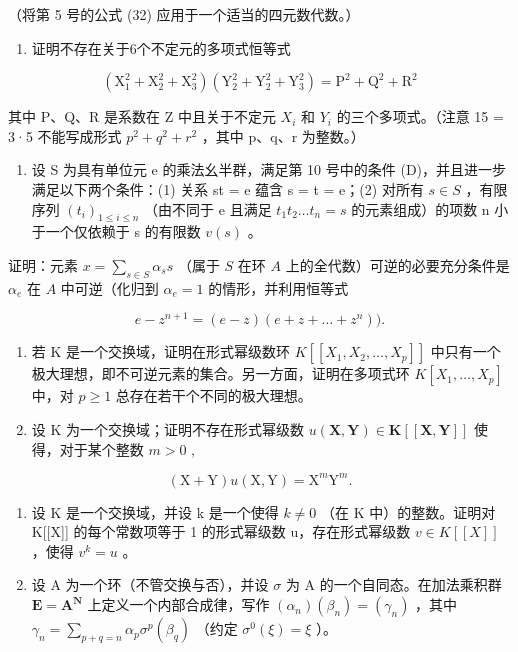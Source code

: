（将第 5 号的公式 (32) 应用于一个适当的四元数代数。）

\begin{enumerate}
\def\labelenumi{\arabic{enumi}.}
\setcounter{enumi}{19}
\tightlist
\item
  证明不存在关于6个不定元的多项式恒等式
\end{enumerate}

\[
(\mathrm{X} _ {1} ^ {2} + \mathrm{X} _ {2} ^ {2} + \mathrm{X} _ {3} ^ {2}) (\mathrm{Y} _ {2} ^ {2} + \mathrm{Y} _ {2} ^ {2} + \mathrm{Y} _ {3} ^ {2}) = \mathrm{P} ^ {2} + \mathrm{Q} ^ {2} + \mathrm{R} ^ {2}
\]

其中 P、Q、R 是系数在 Z 中且关于不定元 \(X_{i}\) 和 \(Y_{i}\) 的三个多项式。（注意 15 = 3·5 不能写成形式 \(p^{2} + q^{2} + r^{2}\) ，其中 p、q、r 为整数。）

\begin{enumerate}
\def\labelenumi{\arabic{enumi}.}
\setcounter{enumi}{20}
\tightlist
\item
  设 S 为具有单位元 e 的乘法幺半群，满足第 10 号中的条件 (D)，并且进一步满足以下两个条件：(1) 关系 st = e 蕴含 s = t = e；(2) 对所有 \(s \in S\) ，有限序列 \((t_{i})_{1 \leq i \leq n}\) （由不同于 e 且满足 \(t_{1}t_{2} \ldots t_{n} = s\) 的元素组成）的项数 n 小于一个仅依赖于 s 的有限数 \(v(s)\) 。
\end{enumerate}

证明：元素 \(x = \sum_{s \in S} \alpha_s s\) （属于 \(S\) 在环 \(A\) 上的全代数）可逆的必要充分条件是 \(\alpha_e\) 在 \(A\) 中可逆（化归到 \(\alpha_e = 1\) 的情形，并利用恒等式

\[
e - z ^ {n + 1} = (e - z) (e + z + \dots + z ^ {n})).
\]

\begin{enumerate}
\def\labelenumi{\arabic{enumi}.}
\setcounter{enumi}{21}
\item
  若 K 是一个交换域，证明在形式幂级数环 \(K[[X_{1}, X_{2}, \ldots, X_{p}]]\) 中只有一个极大理想，即不可逆元素的集合。另一方面，证明在多项式环 \(K[X_{1}, \ldots, X_{p}]\) 中，对 \(p \geqslant 1\) 总存在若干个不同的极大理想。
\item
  设 K 为一个交换域；证明不存在形式幂级数 \(u(\mathbf{X}, \mathbf{Y}) \in \mathbf{K}[[\mathbf{X}, \mathbf{Y}]]\) 使得，对于某个整数 \(m > 0\) ,
\end{enumerate}

\[
(\mathrm{X} + \mathrm{Y}) u (\mathrm{X}, \mathrm{Y}) = \mathrm{X} ^ {m} \mathrm{Y} ^ {m}.
\]

\begin{enumerate}
\def\labelenumi{\arabic{enumi}.}
\setcounter{enumi}{23}
\item
  设 K 是一个交换域，并设 k 是一个使得 \(k \neq 0\) （在 K 中）的整数。证明对 K{[}{[}X{]}{]} 的每个常数项等于 1 的形式幂级数 u，存在形式幂级数 \(v \in K[[X]]\) ，使得 \(v^{k} = u\) 。
\item
  设 A 为一个环（不管交换与否），并设 \(\sigma\) 为 A 的一个自同态。在加法乘积群 \(\mathbf{E} = \mathbf{A}^{\mathbf{N}}\) 上定义一个内部合成律，写作 \((\alpha_{n})(\beta_{n}) = (\gamma_{n})\) ，其中 \(\gamma_{n} = \sum_{p + q = n}\alpha_{p}\sigma^{p}(\beta_{q})\) （约定 \(\sigma^0 (\xi) = \xi\) ）。
\end{enumerate}

